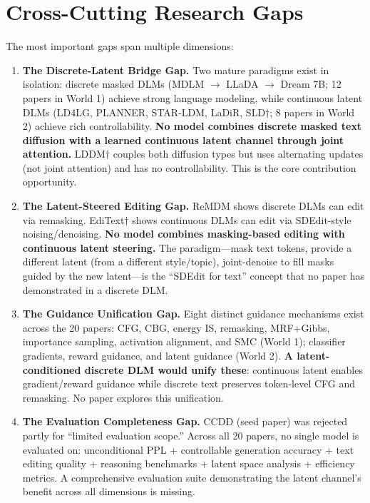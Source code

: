 \documentclass{article}
\begin{document}
\section{Cross-Cutting Research Gaps}

The most important gaps span multiple dimensions:

\begin{enumerate}
    \item \textbf{The Discrete-Latent Bridge Gap.}
    Two mature paradigms exist in isolation: discrete masked DLMs (MDLM $\to$ LLaDA $\to$ Dream 7B; 12 papers in World 1) achieve strong language modeling, while continuous latent DLMs (LD4LG, PLANNER, STAR-LDM, LaDiR, SLD$\dagger$; 8 papers in World 2) achieve rich controllability. \textbf{No model combines discrete masked text diffusion with a learned continuous latent channel through joint attention.} LDDM$\dagger$ couples both diffusion types but uses alternating updates (not joint attention) and has no controllability. This is the core contribution opportunity.

    \item \textbf{The Latent-Steered Editing Gap.}
    ReMDM shows discrete DLMs can edit via remasking. EdiText$\dagger$ shows continuous DLMs can edit via SDEdit-style noising/denoising. \textbf{No model combines masking-based editing with continuous latent steering.} The paradigm---mask text tokens, provide a different latent (from a different style/topic), joint-denoise to fill masks guided by the new latent---is the ``SDEdit for text'' concept that no paper has demonstrated in a discrete DLM.

    \item \textbf{The Guidance Unification Gap.}
    Eight distinct guidance mechanisms exist across the 20 papers: CFG, CBG, energy IS, remasking, MRF+Gibbs, importance sampling, activation alignment, and SMC (World 1); classifier gradients, reward guidance, and latent guidance (World 2). \textbf{A latent-conditioned discrete DLM would unify these}: continuous latent enables gradient/reward guidance while discrete text preserves token-level CFG and remasking. No paper explores this unification.

    \item \textbf{The Evaluation Completeness Gap.}
    CCDD (seed paper) was rejected partly for ``limited evaluation scope.'' Across all 20 papers, no single model is evaluated on: unconditional PPL + controllable generation accuracy + text editing quality + reasoning benchmarks + latent space analysis + efficiency metrics. A comprehensive evaluation suite demonstrating the latent channel's benefit across all dimensions is missing.


\end{enumerate}
\end{document}
